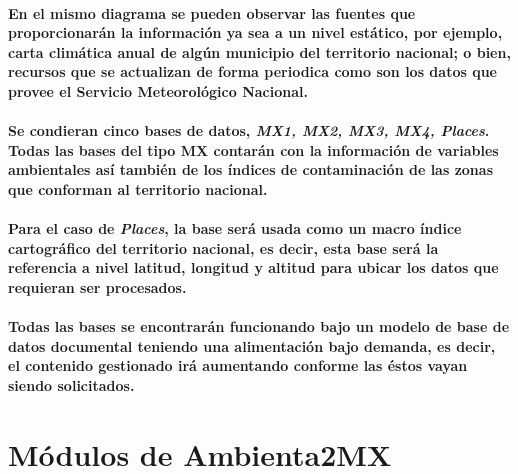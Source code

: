     \paragraph{En el mismo diagrama se pueden observar las fuentes que proporcionarán la información ya sea a un nivel estático, por ejemplo, carta climática anual de algún municipio del territorio nacional; o bien, recursos que se actualizan de forma periodica como son los datos que provee el Servicio Meteorológico Nacional.}
    \paragraph{Se condieran cinco bases de datos, \emph{MX1, MX2, MX3, MX4, Places}. Todas las bases del tipo MX contarán con la información de variables ambientales así también de los índices de contaminación de las zonas que conforman al territorio nacional.}
    \paragraph{Para el caso de \emph{Places}, la base será usada como un macro índice cartográfico del territorio nacional, es decir, esta base será la referencia a nivel latitud, longitud y altitud para ubicar los datos que requieran ser procesados.}
    \paragraph{Todas las bases se encontrarán funcionando bajo un modelo de base de datos documental teniendo una alimentación bajo demanda, es decir, el contenido gestionado irá aumentando conforme las éstos vayan siendo solicitados.}
\section{Módulos de Ambienta2MX}
    
    
    
    
    
    
    